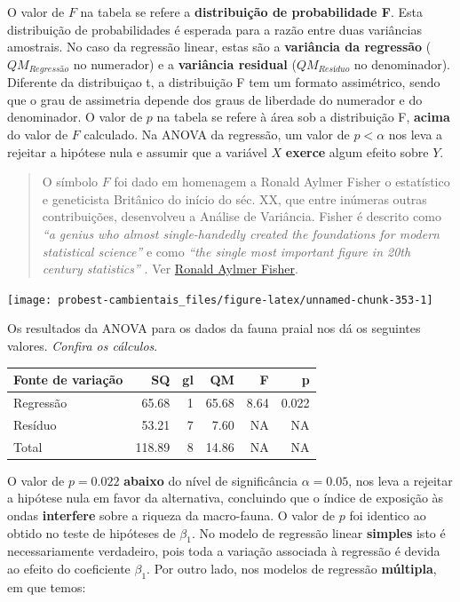 \documentclass[
]{book}
\begin{document}
O valor de \(F\) na tabela se refere a \textbf{distribuição de probabilidade F}. Esta distribuição de probabilidades é esperada para a razão entre duas variâncias amostrais. No caso da regressão linear, estas são a \textbf{variância da regressão} (\(QM_{Regressão}\) no numerador) e a \textbf{variância residual} (\(QM_{Resíduo}\) no denominador). Diferente da distribuiçao t, a distribuição F tem um formato assimétrico, sendo que o grau de assimetria depende dos graus de liberdade do numerador e do denominador. O valor de \(p\) na tabela se refere à área sob a distribuição F, \textbf{acima} do valor de \(F\) calculado. Na ANOVA da regressão, um valor de \(p < \alpha\) nos leva a rejeitar a hipótese nula e assumir que a variável \(X\) \textbf{exerce} algum efeito sobre \(Y\).

\begin{quote}
O símbolo \(F\) foi dado em homenagem a Ronald Aylmer Fisher o estatístico e geneticista Britânico do início do séc. XX, que entre inúmeras outras contribuições, desenvolveu a Análise de Variância. Fisher é descrito como \emph{``a genius who almost single-handedly created the foundations for modern statistical science''} \citep{halt1998history} e como \emph{``the single most important figure in 20th century statistics''} \citep{efron1998r}. Ver \href{https://en.wikipedia.org/wiki/Ronald_Fisher}{Ronald Aylmer Fisher}.
\end{quote}

\begin{center}\texttt{[image: probest-cambientais\_files/figure-latex/unnamed-chunk-353-1]} \end{center}

Os resultados da ANOVA para os dados da fauna praial nos dá os seguintes valores. \emph{Confira os cálculos}.

\begin{tabular}{l|r|r|r|r|r}
\hline
Fonte de variação & SQ & gl & QM & F & p\\
\hline
Regressão & 65.68 & 1 & 65.68 & 8.64 & 0.022\\
\hline
Resíduo & 53.21 & 7 & 7.60 & NA & NA\\
\hline
Total & 118.89 & 8 & 14.86 & NA & NA\\
\hline
\end{tabular}

O valor de \(p = 0.022\) \textbf{abaixo} do nível de significância \(\alpha = 0.05\), nos leva a rejeitar a hipótese nula em favor da alternativa, concluindo que o índice de exposição às ondas \textbf{interfere} sobre a riqueza da macro-fauna. O valor de \(p\) foi identico ao obtido no teste de hipóteses de \(\beta_1\). No modelo de regressão linear \textbf{simples} isto é necessariamente verdadeiro, pois toda a variação associada à regressão é devida ao efeito do coeficiente \(\beta_1\). Por outro lado, nos modelos de regressão \textbf{múltipla}, em que temos:
\end{document}
